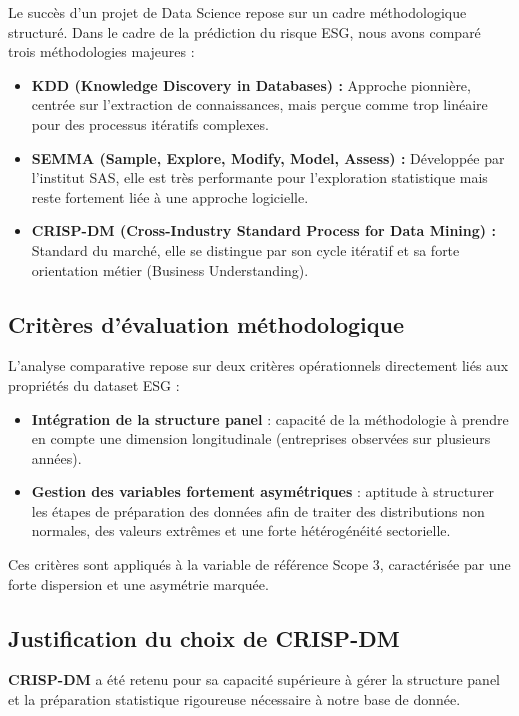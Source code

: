 Le succès d’un projet de Data Science repose sur un cadre méthodologique structuré. Dans le cadre de la prédiction du risque ESG, nous avons comparé trois méthodologies majeures :

\begin{itemize}
    \item \textbf{KDD (Knowledge Discovery in Databases) :} Approche pionnière, centrée sur l'extraction de connaissances, mais perçue comme trop linéaire pour des processus itératifs complexes.\cite{shafique2014comparative}
    \item \textbf{SEMMA (Sample, Explore, Modify, Model, Assess) :} Développée par l'institut SAS, elle est très performante pour l'exploration statistique mais reste fortement liée à une approche logicielle.\cite{shafique2014comparative}
    \item \textbf{CRISP-DM (Cross-Industry Standard Process for Data Mining) :} Standard du marché, elle se distingue par son cycle itératif et sa forte orientation métier (Business Understanding).\cite{shafique2014comparative}
\end{itemize}

\subsection{Critères d'évaluation méthodologique}

L'analyse comparative repose sur deux critères opérationnels directement liés aux
propriétés du dataset ESG :

\begin{itemize}
    \item \textbf{Intégration de la structure panel} : capacité de la méthodologie à prendre en compte une dimension longitudinale (entreprises observées sur plusieurs années).

    \item \textbf{Gestion des variables fortement asymétriques} : aptitude à structurer les étapes de préparation des données afin de traiter des distributions non normales, des valeurs extrêmes et une forte hétérogénéité sectorielle.
\end{itemize}

Ces critères sont appliqués à la variable de référence Scope 3, caractérisée par une forte dispersion et une asymétrie marquée. 

\subsection{Justification du choix de CRISP-DM}
\textbf{CRISP-DM} a été retenu pour sa capacité supérieure à gérer la structure panel et la préparation statistique rigoureuse nécessaire à notre base de donnée.
\cite{wirth2000crisp}

